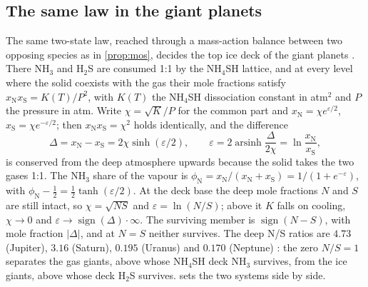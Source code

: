 \documentclass[11pt]{article}
\theoremstyle{definition}\newtheorem{definition}[theorem]{Definition}
\theoremstyle{remark}\newtheorem{remark}[theorem]{Remark}
\begin{document}
\subsection{The same law in the giant planets}\label{sec:giants}
The same two-state law, reached through a mass-action balance between two opposing species as in \cref{prop:mos}, decides the top ice deck of the giant planets \cite{Planet}. There NH$_3$ and H$_2$S are consumed 1:1 by the NH$_4$SH lattice, and at every level where the solid coexists with the gas their mole fractions satisfy $x_{\mathrm N}x_{\mathrm S}=K(T)/P^2$, with $K(T)$ the NH$_4$SH dissociation constant in atm$^2$ and $P$ the pressure in atm. Write $\chi=\sqrt{K}/P$ for the common part and $x_{\mathrm N}=\chi e^{\varepsilon/2}$, $x_{\mathrm S}=\chi e^{-\varepsilon/2}$; then $x_{\mathrm N}x_{\mathrm S}=\chi^2$ holds identically, and the difference
\[
\Delta=x_{\mathrm N}-x_{\mathrm S}=2\chi\sinh(\varepsilon/2),\qquad\varepsilon=2\operatorname{arsinh}\frac{\Delta}{2\chi}=\ln\frac{x_{\mathrm N}}{x_{\mathrm S}},
\]
is conserved from the deep atmosphere upwards because the solid takes the two gases 1:1. The NH$_3$ share of the vapour is $\phi_{\mathrm N}=x_{\mathrm N}/(x_{\mathrm N}+x_{\mathrm S})=1/(1+e^{-\varepsilon})$, with $\phi_{\mathrm N}-\frac12=\frac12\tanh(\varepsilon/2)$. At the deck base the deep mole fractions $N$ and $S$ are still intact, so $\chi=\sqrt{NS}$ and $\varepsilon=\ln(N/S)$; above it $K$ falls on cooling, $\chi\to0$ and $\varepsilon\to\operatorname{sign}(\Delta)\cdot\infty$. The surviving member is $\operatorname{sign}(N-S)$, with mole fraction $|\Delta|$, and at $N=S$ neither survives. The deep N/S ratios are $4.73$ (Jupiter), $3.16$ (Saturn), $0.195$ (Uranus) and $0.170$ (Neptune) \cite{Planet}: the zero $N/S=1$ separates the gas giants, above whose NH$_4$SH deck NH$_3$ survives, from the ice giants, above whose deck H$_2$S survives.  sets the two systems side by side.
\end{document}
